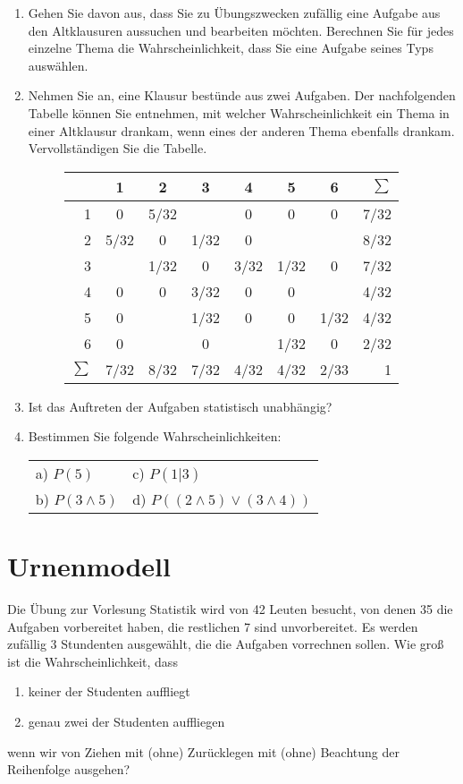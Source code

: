 \documentclass[11pt, a4paper]{article}
\begin{document}
\begin{enumerate}
\item Gehen Sie davon aus, dass Sie zu Übungszwecken zufällig eine Aufgabe aus den Altklausuren aussuchen und bearbeiten möchten. Berechnen Sie für jedes einzelne Thema die Wahrscheinlichkeit, dass Sie eine Aufgabe seines Typs auswählen.
\item Nehmen Sie an, eine Klausur bestünde aus zwei Aufgaben. Der nachfolgenden Tabelle können Sie entnehmen, mit welcher Wahrscheinlichkeit ein Thema in einer Altklausur drankam, wenn eines der anderen Thema ebenfalls drankam. Vervollständigen Sie die Tabelle.


\begin{figure}[h!]
\centering
\setlength\extrarowheight{5pt}
\begin{tabular}{r|cccccc|r}
	  		& 1 	& 2 	& 3 	& 4 	& 5 	& 6 	& $\sum$\\ \hline
	1 		& 0 	& 5/32 	&  		& 0  	& 0  	& 0 	& 7/32 \\
	2 		& 5/32	& 0		& 1/32 	& 0 	&   	&   	& 8/32 \\
	3 		& 		& 1/32 	& 0 	& 3/32 	& 1/32 	& 0  	& 7/32 \\
	4 		& 0		& 0 	& 3/32 	& 0 	& 0  	&   	& 4/32 \\
	5 		& 0  	&   	& 1/32 	& 0 	& 0  	& 1/32 	& 4/32 \\
	6 		& 0 	&   	& 0  	&  		& 1/32 	& 0 	& 2/32 \\ \hline
	$\sum$ 	& 7/32 	& 8/32 	& 7/32 	& 4/32 	& 4/32 	& 2/33  & 1\\
\end{tabular}
\end{figure}

\item Ist das Auftreten der Aufgaben statistisch unabhängig?
\item Bestimmen Sie folgende Wahrscheinlichkeiten:

	\begin{tabular}{ll}
	a) $P(5)$ \hspace{5cm} 				& c) $P(1|3)$\\
	b) $P(3 \land 5)$ 					& d) $P((2 \land 5) \lor (3 \land 4))$
	\end{tabular}

\end{enumerate}

\newpage
\section{Urnenmodell}
Die Übung zur Vorlesung Statistik wird von 42 Leuten besucht, von denen 35 die Aufgaben vorbereitet haben, die restlichen 7 sind unvorbereitet. Es werden zufällig 3 Stundenten ausgewählt, die die Aufgaben vorrechnen sollen. Wie groß ist die Wahrscheinlichkeit, dass
\begin{enumerate}
	\item keiner der Studenten auffliegt
	\item genau zwei der Studenten auffliegen
\end{enumerate}
wenn wir von Ziehen mit (ohne) Zurücklegen mit (ohne) Beachtung der Reihenfolge ausgehen?
\end{document}

